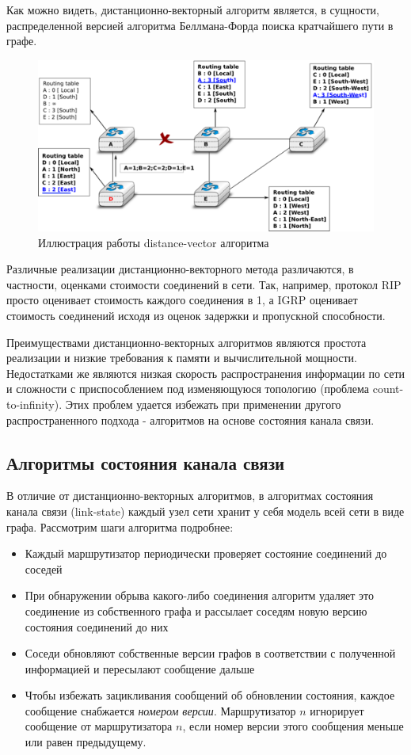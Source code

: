 \documentclass[]{itmo-student-thesis}
\begin{document}
Как можно видеть, дистанционно-векторный алгоритм является, в сущности,
распределенной версией алгоритма Беллмана-Форда поиска кратчайшего пути в
графе\cite{bellman-ford}.

\begin{figure}[!h]
  \caption{Иллюстрация работы distance-vector алгоритма}\label{rip-img}
  \centering
  \includegraphics[scale=1.5]{dv-failure-2}
\end{figure}

Различные реализации дистанционно-векторного метода различаются, в частности,
оценками стоимости соединений в сети. Так, например, протокол RIP\cite{rip-rfc} просто
оценивает стоимость каждого соединения в 1, а IGRP\cite{igrp-patent} оценивает
стоимость соединений исходя из оценок задержки и пропускной способности.

Преимуществами дистанционно-векторных алгоритмов являются простота реализации и
низкие требования к памяти и вычислительной мощности. Недостатками же являются
низкая скорость распространения информации по сети и сложности с приспособлением
под изменяющуюся топологию (проблема count-to-infinity). Этих проблем
удается избежать при применении другого распространенного подхода - алгоритмов
на основе состояния канала связи. 

\subsection{Алгоритмы состояния канала связи}

В отличие от дистанционно-векторных алгоритмов, в алгоритмах состояния канала связи
(link-state) каждый узел сети хранит у себя модель всей сети в виде графа.
Рассмотрим шаги алгоритма подробнее:

\begin{itemize}
\item Каждый маршрутизатор периодически проверяет состояние соединений до
  соседей
\item При обнаружении обрыва какого-либо соединения алгоритм удаляет это
  соединение из собственного графа и рассылает соседям новую версию состояния
  соединений до них
\item Соседи обновляют собственные версии графов в соответствии с полученной
  информацией и пересылают сообщение дальше
\item Чтобы избежать зацикливания сообщений об обновлении состояния, каждое
  сообщение снабжается \textit{номером версии}. Маршрутизатор $n$ игнорирует
  сообщение от маршрутизатора $n$, если номер версии этого сообщения меньше или
  равен предыдущему.
\end{itemize}
\end{document}
